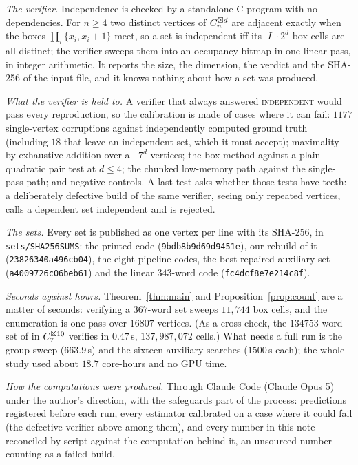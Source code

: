 \emph{The verifier.} Independence is checked by a standalone C program with no dependencies.
For $n\ge4$ two distinct vertices of $C_n^{\boxtimes d}$ are adjacent exactly when the boxes
$\prod_i\{x_i,x_i+1\}$ meet, so a set is independent iff its $|I|\cdot 2^d$ box cells are all
distinct; the verifier sweeps them into an occupancy bitmap in one linear pass, in integer
arithmetic. It reports the size, the dimension, the verdict and the SHA-256 of the input file,
and it knows nothing about how a set was produced.

\emph{What the verifier is held to.} A verifier that always answered
\textsc{independent} would pass every reproduction, so the calibration is made of cases where
it can fail: $1177$ single-vertex corruptions against independently computed ground truth
(including $18$ that leave an independent set, which it must accept); maximality by exhaustive
addition over all $7^d$ vertices; the box method against a plain quadratic pair test at
$d\le4$; the chunked low-memory path against the single-pass path; and negative controls. A
last test asks whether those tests have teeth: a deliberately defective build of the same
verifier, seeing only repeated vertices, calls a dependent set independent and is rejected.

\emph{The sets.} Every set is published as one vertex per line with its SHA-256, in
\texttt{sets/SHA256SUMS}: the printed code (\texttt{9bdb8b9d69d9451e}), our rebuild of it
(\texttt{23826340a496cb04}), the eight pipeline codes, the best repaired auxiliary set
(\texttt{a4009726c06beb61}) and the linear $343$-word code (\texttt{fc4dcf8e7e214c8f}).

\emph{Seconds against hours.} Theorem~\ref{thm:main} and Proposition~\ref{prop:count} are a
matter of seconds: verifying a $367$-word set sweeps $11{,}744$ box cells, and the enumeration
is one pass over $16807$ vertices. (As a cross-check, the $134753$-word set of \cite{itty2026}
in $C_7^{\boxtimes 10}$ verifies in $0.47$\,s, $137{,}987{,}072$ cells.) What needs a full run is
the group sweep ($663.9$\,s) and the sixteen auxiliary searches ($1500$\,s each); the whole
study used about $18.7$ core-hours and no GPU time.

\emph{How the computations were produced.} Through Claude Code (Claude Opus 5) under the author's
direction, with the safeguards part of the process: predictions registered before each run, every
estimator calibrated on a case where it could fail (the defective verifier above among them), and
every number in this note reconciled by script against the computation behind it, an unsourced
number counting as a failed build.

